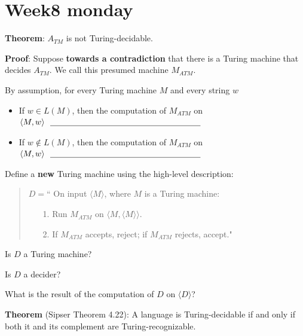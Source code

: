 \documentclass[12pt, oneside]{article}
\begin{document}
\begin{flushright}
\end{flushright} \section*{Week8 monday}



{\bf  Theorem}: $A_{TM}$  is  not  Turing-decidable.

{\bf  Proof}: Suppose {\bf towards a  contradiction}  that there  is a Turing machine  that decides $A_{TM}$.  
We call this presumed machine  $M_{ATM}$.

By  assumption, for every  Turing machine  $M$ and every  string $w$

\begin{itemize}
\item If $w \in L(M)$, then  the computation of $M_{ATM}$  on  $\langle M,w \rangle ~~ \underline{\phantom{\hspace{2.5in}}}$
\item If $w \notin L(M)$, then  the computation of $M_{ATM}$  on  $\langle M,w \rangle ~~ \underline{\phantom{\hspace{2.5in}}}$
\end{itemize}


Define  a {\bf new} Turing machine using  the high-level description:
\begin{quote}
$D =  $`` On  input $\langle M \rangle$, where  $M$  is  a Turing machine:
\begin{itemize}
\item[1.] Run  $M_{ATM}$ on  $\langle M, \langle M \rangle  \rangle$.
\item[2.] If $M_{ATM}$ accepts, reject; if  $M_{ATM}$ rejects, accept."
\end{itemize}
\end{quote}


Is $D$ a  Turing machine?

\vspace{50pt}

Is  $D$ a  decider? 

\vspace{50pt}

What is the result of the computation  of $D$  on  $\langle D \rangle$?

\vfill

\newpage

{\bf  Theorem} (Sipser Theorem 4.22): A  language is Turing-decidable if and only if both  it and its complement
are Turing-recognizable.
\end{document}

